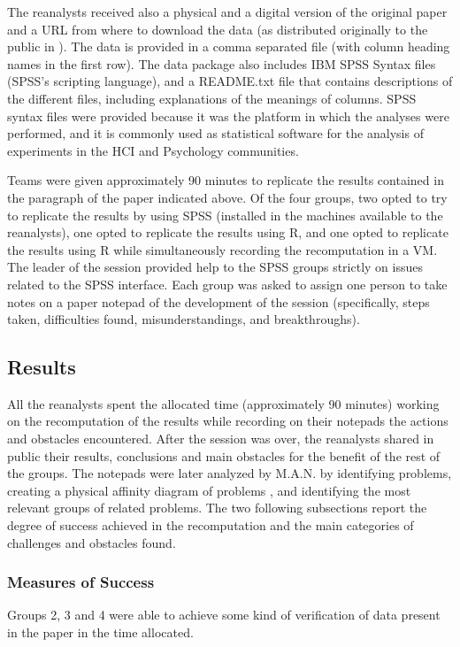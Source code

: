 The reanalysts received also a physical and a digital version of the original paper and a URL from where to download the data (as distributed originally to the public in \cite{Nacenta:memorability_data}). The data is provided in a comma separated file (with column heading names in the first row). The data package also includes IBM SPSS Syntax files (SPSS's scripting language), and a README.txt file that contains descriptions of the different files, including explanations of the meanings of columns. SPSS syntax files were provided because it was the platform in which the analyses were performed, and it is commonly used as statistical software for the analysis of experiments in the HCI and Psychology communities. 

Teams were given approximately 90 minutes to replicate the results contained in the paragraph of the paper indicated above. Of the four groups, two opted to try to replicate the results by using SPSS (installed in the machines available to the reanalysts), one opted to replicate the results using R, and one opted to replicate the results using R while simultaneously recording the recomputation in a VM. The leader of the session provided help to the SPSS groups strictly on issues related to the SPSS interface. Each group was asked to assign one person to take notes on a paper notepad of the development of the session (specifically, steps taken, difficulties found, misunderstandings, and breakthroughs).

\subsection{Results}
All the reanalysts spent the allocated time (approximately 90 minutes) working on the recomputation of the results while recording on their notepads the actions and obstacles encountered. After the session was over, the reanalysts shared in public their results, conclusions and main obstacles for the benefit of the rest of the groups. The notepads were later analyzed by M.A.N. by identifying problems, creating a physical affinity diagram of problems \cite{GUIBook}, and identifying the most relevant groups of related problems. The two following subsections report the degree of success achieved in the recomputation and the main categories of challenges and obstacles found.

\subsubsection{Measures of Success}
Groups 2, 3 and 4 were able to achieve some kind of verification of data present in the paper in the time allocated.

